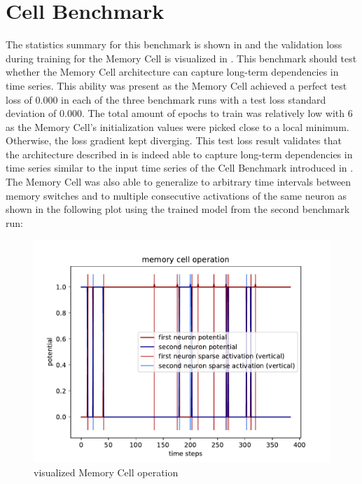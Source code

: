 \documentclass[draft,final]{vutinfth} %
\begin{document}
    \section{Cell Benchmark} \label{cell_results}
    The statistics summary for this benchmark is shown in  and the validation loss during training for the Memory Cell is visualized in .
    This benchmark should test whether the Memory Cell architecture can capture long-term dependencies in time series.
    This ability was present as the Memory Cell achieved a perfect test loss of $0.000$ in each of the three benchmark runs with a test loss standard deviation of $0.000$.
    The total amount of epochs to train was relatively low with $6$ as the Memory Cell's initialization values were picked close to a local minimum. Otherwise, the loss gradient kept diverging.
    This test loss result validates that the architecture described in  is indeed able to capture long-term dependencies in time series similar to the input time series of the Cell Benchmark introduced in .
    The Memory Cell was also able to generalize to arbitrary time intervals between memory switches and to multiple consecutive activations of the same neuron as shown in the following plot using the trained model from the second benchmark run:
    \begin{figure}[H]
        \centering{}
        \includegraphics[width=\linewidth]{graphics/memory_cell_operation.pdf}
        \caption{visualized Memory Cell operation}
        \label{fig:memory_cell_operation_vis}
    \end{figure}
\end{document}
